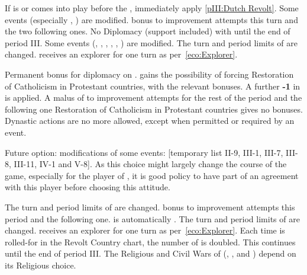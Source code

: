 \begin{digressions}


   If \paysVhollande is or comes into play
  before the , immediately apply \ref{pIII:Dutch Revolt}.
  \aparag[\CATHCR]
  \bparag Some events (especially , ) are modified.
  \aparag[\CATHCO]
  \bparag {} bonus to \STAB improvement attempts this turn and the two
  following ones.
  \aparag[Protestantism]
  \bparag No Diplomacy (support included) with \payspapaute until the end of
  period III.
  \bparag Some events (, , , ,
   ,
  ) are modified.
  \bparag The turn and period limits of \FRA are changed. \FRA receives an
  explorer for one turn as per~\ref{eco:Explorer}.



  \aparag[\CATHCR]
  \bparag Permanent bonus  for diplomacy on \payspapaute.
  \bparag \SPA gains the possibility of forcing Restoration of Catholicism in
  Protestant countries, with the relevant bonuses.
  \aparag[\CATHCO]
  \bparag A further {\bf -1} in \STAB is applied.
  \bparag A malus of  to \STAB improvement attempts for the rest of
  the period and the following one
  \bparag Restoration of Catholicism in Protestant countries gives no bonuses.
  \bparag Dynastic actions are no more allowed, except when permitted or
  required by an event.
  \begin{designnote} Future option: modifications of some events: [temporary
    list II-9, III-1, III-7, III-8, III-11, IV-1 and V-8]. As this choice
    might largely change the course of the game, especially for the player of
    \VEN, it is good policy to have part of an agreement with this player
    before choosing this attitude.
  \end{designnote}



  \aparag[\CATHCR]
  \bparag The turn and period limits of \ENG are changed.
  \aparag[\CATHCO]
  \bparag {} bonus to \STAB improvement attempts this period and the
  following one.
  \aparag[Protestantism]
  \bparag \ANG is automatically \PROTPUR.
  \bparag The turn and period limits of \ENG are changed. \ENG receives an
  explorer for one turn as per~\ref{eco:Explorer}.
  \bparag Each time \ENG is rolled-for in the Revolt Country chart, the number
  of \REVOLT is doubled. This continues until the end of period III.
  \aparag The Religious and Civil Wars of \ENG (,
  ,  and
  ) depend on its Religious choice.



\end{digressions}

